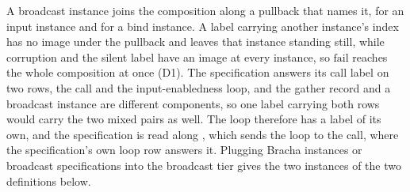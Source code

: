 \begin{definition}
  A broadcast instance joins the composition along a pullback that names it,  for an input instance and  for a bind instance.
  A label carrying another instance's index has no image under the pullback and leaves that instance standing still, while corruption and the silent label have an image at every instance, so $\mathrm{fail}$ reaches the whole composition at once (D1).
  The specification answers its call label on two rows, the call and the input-enabledness loop, and the gather record and a broadcast instance are different components, so one label carrying both rows would carry the two mixed pairs as well.
  The loop therefore has a label of its own, and the specification is read along , which sends the loop to the call, where the specification's own loop row answers it.
  Plugging Bracha instances or broadcast specifications into the broadcast tier gives the two instances of the two definitions below.
\end{definition}
